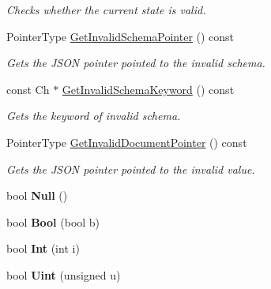 \begin{DoxyCompactItemize}
\begin{DoxyCompactList}\small\item\em Checks whether the current state is valid. \end{DoxyCompactList}\item 
Pointer\+Type \hyperlink{a00126_a39879de53c70fd5d3c018b61d1235681}{Get\+Invalid\+Schema\+Pointer} () const \hypertarget{a00126_a39879de53c70fd5d3c018b61d1235681}{}\label{a00126_a39879de53c70fd5d3c018b61d1235681}

\begin{DoxyCompactList}\small\item\em Gets the J\+S\+ON pointer pointed to the invalid schema. \end{DoxyCompactList}\item 
const Ch $\ast$ \hyperlink{a00126_a016b23047ed66bac570e378fbaaf839b}{Get\+Invalid\+Schema\+Keyword} () const \hypertarget{a00126_a016b23047ed66bac570e378fbaaf839b}{}\label{a00126_a016b23047ed66bac570e378fbaaf839b}

\begin{DoxyCompactList}\small\item\em Gets the keyword of invalid schema. \end{DoxyCompactList}\item 
Pointer\+Type \hyperlink{a00126_ae65727ef84d82f3e31e1f57543e71320}{Get\+Invalid\+Document\+Pointer} () const \hypertarget{a00126_ae65727ef84d82f3e31e1f57543e71320}{}\label{a00126_ae65727ef84d82f3e31e1f57543e71320}

\begin{DoxyCompactList}\small\item\em Gets the J\+S\+ON pointer pointed to the invalid value. \end{DoxyCompactList}\item 
bool {\bfseries Null} ()\hypertarget{a00126_a7137af73e934f50c66cbb8a9aa802ea6}{}\label{a00126_a7137af73e934f50c66cbb8a9aa802ea6}

\item 
bool {\bfseries Bool} (bool b)\hypertarget{a00126_aa25fa7456f2f308a105e400f01a4afde}{}\label{a00126_aa25fa7456f2f308a105e400f01a4afde}

\item 
bool {\bfseries Int} (int i)\hypertarget{a00126_ad823c29990225661a4df69d34647b659}{}\label{a00126_ad823c29990225661a4df69d34647b659}

\item 
bool {\bfseries Uint} (unsigned u)\hypertarget{a00126_aa688665c5274f93543c84a4b6cabe8da}{}\label{a00126_aa688665c5274f93543c84a4b6cabe8da}


\end{DoxyCompactItemize}

